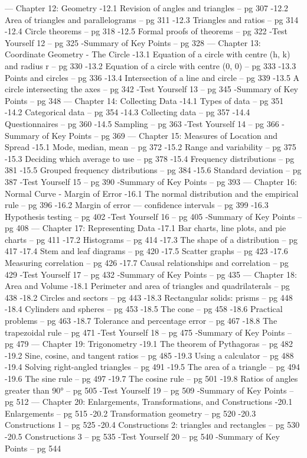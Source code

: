 ---
 Chapter 12: Geometry  
-12.1 Revision of angles and triangles – pg 307  
-12.2 Area of triangles and parallelograms – pg 311  
-12.3 Triangles and ratios – pg 314  
-12.4 Circle theorems – pg 318  
-12.5 Formal proofs of theorems – pg 322  
-Test Yourself 12 – pg 325  
-Summary of Key Points – pg 328  
---
 Chapter 13: Coordinate Geometry - The Circle  
-13.1 Equation of a circle with centre (h, k) and radius r – pg 330  
-13.2 Equation of a circle with centre (0, 0) – pg 333  
-13.3 Points and circles – pg 336  
-13.4 Intersection of a line and circle – pg 339  
-13.5 A circle intersecting the axes – pg 342  
-Test Yourself 13 – pg 345  
-Summary of Key Points – pg 348  
---
 Chapter 14: Collecting Data  
-14.1 Types of data – pg 351  
-14.2 Categorical data – pg 354  
-14.3 Collecting data – pg 357  
-14.4 Questionnaires – pg 360  
-14.5 Sampling – pg 363  
-Test Yourself 14 – pg 366  
-Summary of Key Points – pg 369  
---
 Chapter 15: Measures of Location and Spread  
-15.1 Mode, median, mean – pg 372  
-15.2 Range and variability – pg 375  
-15.3 Deciding which average to use – pg 378  
-15.4 Frequency distributions – pg 381  
-15.5 Grouped frequency distributions – pg 384  
-15.6 Standard deviation – pg 387  
-Test Yourself 15 – pg 390  
-Summary of Key Points – pg 393  
---
 Chapter 16: Normal Curve - Margin of Error  
-16.1 The normal distribution and the empirical rule – pg 396  
-16.2 Margin of error — confidence intervals – pg 399  
-16.3 Hypothesis testing – pg 402  
-Test Yourself 16 – pg 405  
-Summary of Key Points – pg 408  
---
 Chapter 17: Representing Data  
-17.1 Bar charts, line plots, and pie charts – pg 411  
-17.2 Histograms – pg 414  
-17.3 The shape of a distribution – pg 417  
-17.4 Stem and leaf diagrams – pg 420  
-17.5 Scatter graphs – pg 423  
-17.6 Measuring correlation – pg 426  
-17.7 Causal relationships and correlation – pg 429  
-Test Yourself 17 – pg 432  
-Summary of Key Points – pg 435  
---
 Chapter 18: Area and Volume  
-18.1 Perimeter and area of triangles and quadrilaterals – pg 438  
-18.2 Circles and sectors – pg 443  
-18.3 Rectangular solids: prisms – pg 448  
-18.4 Cylinders and spheres – pg 453  
-18.5 The cone – pg 458  
-18.6 Practical problems – pg 463  
-18.7 Tolerance and percentage error – pg 467  
-18.8 The trapezoidal rule – pg 471  
-Test Yourself 18 – pg 475  
-Summary of Key Points – pg 479  
---
 Chapter 19: Trigonometry  
-19.1 The theorem of Pythagoras – pg 482  
-19.2 Sine, cosine, and tangent ratios – pg 485  
-19.3 Using a calculator – pg 488  
-19.4 Solving right-angled triangles – pg 491  
-19.5 The area of a triangle – pg 494  
-19.6 The sine rule – pg 497  
-19.7 The cosine rule – pg 501  
-19.8 Ratios of angles greater than 90° – pg 505  
-Test Yourself 19 – pg 509  
-Summary of Key Points – pg 512  
---
 Chapter 20: Enlargements, Transformations, and Constructions  
-20.1 Enlargements – pg 515  
-20.2 Transformation geometry – pg 520  
-20.3 Constructions 1 – pg 525  
-20.4 Constructions 2: triangles and rectangles – pg 530  
-20.5 Constructions 3 – pg 535  
-Test Yourself 20 – pg 540  
-Summary of Key Points – pg 544  
